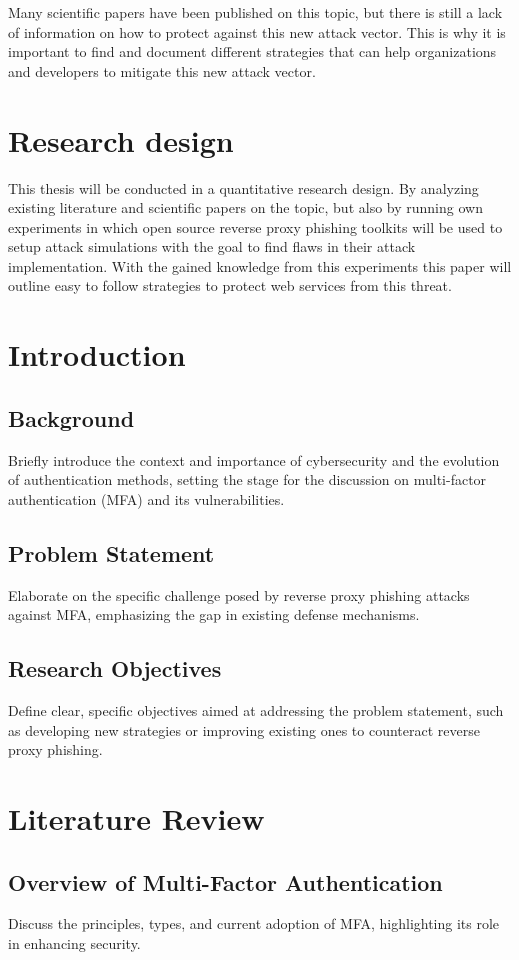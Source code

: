 \documentclass [14pt]{extarticle}
\begin{document}
Many scientific papers have been published on this topic, but there is still a lack of information on how to protect against this new attack vector. This is why it is important to find and document different strategies that can help organizations and developers to mitigate this new attack vector.

\section{Research design}
This thesis will be conducted in a quantitative research design. By analyzing existing literature and scientific papers on the topic, but also by running own experiments in which open source reverse proxy phishing toolkits will be used to setup attack simulations with the goal to find flaws in their attack implementation. With the gained knowledge from this experiments this paper will outline easy to follow strategies to protect web services from this threat.

\newpage
\section{Introduction}
\subsection{Background}
Briefly introduce the context and importance of cybersecurity and the evolution of authentication methods, setting the stage for the discussion on multi-factor authentication (MFA) and its vulnerabilities.
\subsection{Problem Statement}
Elaborate on the specific challenge posed by reverse proxy phishing attacks against MFA, emphasizing the gap in existing defense mechanisms.
\subsection{Research Objectives}
Define clear, specific objectives aimed at addressing the problem statement, such as developing new strategies or improving existing ones to counteract reverse proxy phishing.

\section{Literature Review}
\subsection{Overview of Multi-Factor Authentication}
Discuss the principles, types, and current adoption of MFA, highlighting its role in enhancing security.
\end{document}
